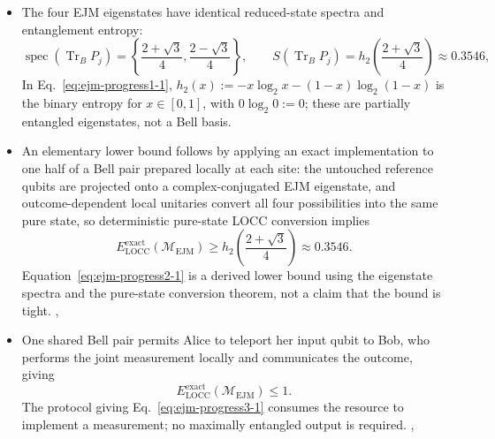 \begin{itemize}
  \item The four EJM eigenstates have identical reduced-state spectra and entanglement entropy:
  \begin{equation}
\operatorname{spec}(\operatorname{Tr}_B P_j)
  =\left\{\frac{2+\sqrt3}{4},\frac{2-\sqrt3}{4}\right\},
  \qquad
  S(\operatorname{Tr}_B P_j)
  =h_2\left(\frac{2+\sqrt3}{4}\right)\approx0.3546,
\label{eq:ejm-progress1-1}
\end{equation}
  In Eq.~\eqref{eq:ejm-progress1-1}, $h_2(x):=-x\log_2x-(1-x)\log_2(1-x)$ is the binary entropy for $x\in[0,1]$, with $0\log_2 0:=0$; these are partially entangled eigenstates, not a Bell basis. 

  \item An elementary lower bound follows by applying an exact implementation to one half of a Bell pair prepared locally at each site: the untouched reference qubits are projected onto a complex-conjugated EJM eigenstate, and outcome-dependent local unitaries convert all four possibilities into the same pure state, so deterministic pure-state LOCC conversion implies
  \begin{equation}
E_{\mathrm{LOCC}}^{\mathrm{exact}}(\mathcal M_{\mathrm{EJM}})
  \geq h_2\left(\frac{2+\sqrt3}{4}\right)\approx0.3546.
\label{eq:ejm-progress2-1}
\end{equation}
  Equation~\eqref{eq:ejm-progress2-1} is a derived lower bound using the eigenstate spectra and the pure-state conversion theorem, not a claim that the bound is tight. , 

  \item One shared Bell pair permits Alice to teleport her input qubit to Bob, who performs the joint measurement locally and communicates the outcome, giving
  \begin{equation}
E_{\mathrm{LOCC}}^{\mathrm{exact}}(\mathcal M_{\mathrm{EJM}})\leq1.
\label{eq:ejm-progress3-1}
\end{equation}
  The protocol giving Eq.~\eqref{eq:ejm-progress3-1} consumes the resource to implement a measurement; no maximally entangled output is required. , 


\end{itemize}
